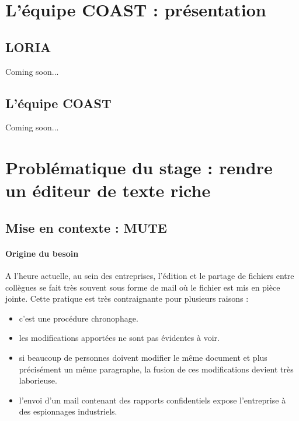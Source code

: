 \documentclass[12pt]{article}
\begin{document}
\newpage
\section{L'équipe COAST : présentation}
\subsection{LORIA}
Coming soon...
\subsection{L'équipe COAST}
Coming soon...

\newpage
\section{Problématique du stage : rendre un éditeur de texte riche}
\subsection{Mise en contexte : MUTE}
\paragraph{Origine du besoin}
A l'heure actuelle, au sein des entreprises, l'édition et le partage de fichiers entre collègues se fait très souvent sous forme de mail où le fichier est mis en pièce jointe. Cette pratique est très contraignante pour plusieurs raisons :\\
\begin{itemize}
    \item c'est une procédure chronophage.
    \item les modifications apportées ne sont pas évidentes à voir.
    \item si beaucoup de personnes doivent modifier le même document et plus précisément un même paragraphe, la fusion de ces modifications devient très laborieuse.
    \item l'envoi d'un mail contenant des rapports confidentiels expose l'entreprise à des espionnages industriels.
\end{itemize}
\end{document}
